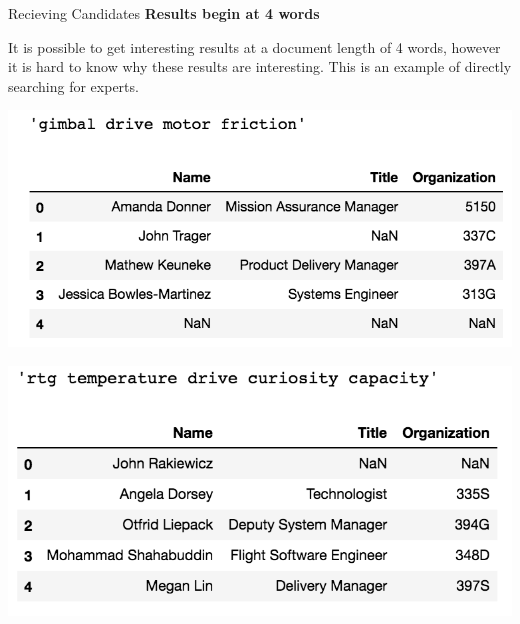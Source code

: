 \documentclass[10pt]{beamer}
\begin{document}
\begin{frame}{Recieving Candidates}
  {\bf Results begin at 4 words}

  It is possible to get interesting results at a document length of 4 words,
  however it is hard to know why these results are interesting.
  This is an example of directly searching for experts.

  \begin{multicols}{2}
    \includegraphics[width=\columnwidth]{query1.png}

    \includegraphics[width=\columnwidth]{query2.png}
  \end{multicols}


\end{frame}
\end{document}
